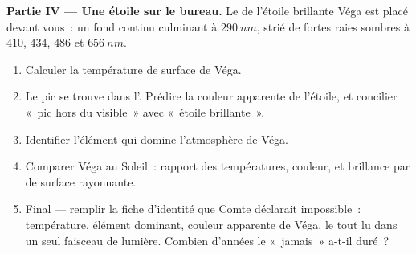 \begin{problem}
\medskip
\noindent\textbf{Partie IV --- Une étoile sur le bureau.}
Le  de l'étoile brillante Véga est placé devant vous~: un fond
continu culminant à $\qty{290}{nm}$, strié de fortes raies sombres à
$410$, $434$, $486$ et $\qty{656}{nm}$.
\begin{enumerate}[resume]
  \item Calculer la température de surface de Véga.
  \item Le pic se trouve dans l'. Prédire la couleur
        apparente de l'étoile, et concilier «~pic hors du visible~» avec
        «~étoile brillante~».
  \item Identifier l'élément qui domine l'atmosphère de Véga.
  \item Comparer Véga au Soleil~: rapport des températures, couleur, et
        brillance par  de surface rayonnante.
  \item Final --- remplir la fiche d'identité que Comte déclarait
        impossible~: température, élément dominant, couleur apparente
        de Véga, le tout lu dans un seul faisceau de lumière. Combien
        d'années le «~jamais~» a-t-il duré~?
\end{enumerate}
\end{problem}
